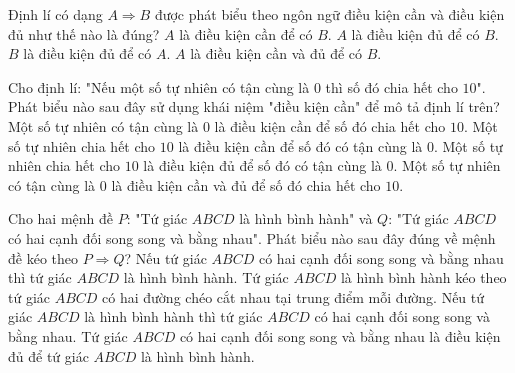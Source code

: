 \begin{ex}
	Định lí có dạng $A \Rightarrow B$ được phát biểu theo ngôn ngữ điều kiện cần và điều kiện đủ như thế nào là đúng?
	\choice
	{$A$ là điều kiện cần để có $B$.}
	{\True $A$ là điều kiện đủ để có $B$.}
	{$B$ là điều kiện đủ để có $A$.}
	{$A$ là điều kiện cần và đủ để có $B$.}
\end{ex}

\begin{ex}
	Cho định lí: "Nếu một số tự nhiên có tận cùng là $0$ thì số đó chia hết cho $10$". Phát biểu nào sau đây sử dụng khái niệm "điều kiện cần" để mô tả định lí trên?
	\choice
	{Một số tự nhiên có tận cùng là $0$ là điều kiện cần để số đó chia hết cho $10$.}
	{\True Một số tự nhiên chia hết cho $10$ là điều kiện cần để số đó có tận cùng là $0$.}
	{Một số tự nhiên chia hết cho $10$ là điều kiện đủ để số đó có tận cùng là $0$.}
	{Một số tự nhiên có tận cùng là $0$ là điều kiện cần và đủ để số đó chia hết cho $10$.}
\end{ex}

\begin{ex}
	Cho hai mệnh đề $P$: "Tứ giác $ABCD$ là hình bình hành" và $Q$: "Tứ giác $ABCD$ có hai cạnh đối song song và bằng nhau". Phát biểu nào sau đây đúng về mệnh đề kéo theo $P \Rightarrow Q$?
	\choice
	{Nếu tứ giác $ABCD$ có hai cạnh đối song song và bằng nhau thì tứ giác $ABCD$ là hình bình hành.}
	{Tứ giác $ABCD$ là hình bình hành kéo theo tứ giác $ABCD$ có hai đường chéo cắt nhau tại trung điểm mỗi đường.}
	{\True Nếu tứ giác $ABCD$ là hình bình hành thì tứ giác $ABCD$ có hai cạnh đối song song và bằng nhau.}
	{Tứ giác $ABCD$ có hai cạnh đối song song và bằng nhau là điều kiện đủ để tứ giác $ABCD$ là hình bình hành.}
\end{ex}

